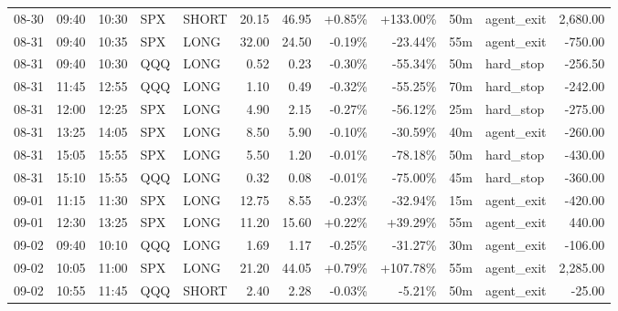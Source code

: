 \documentclass[11pt,a4paper,twoside]{article}
\begin{document}
\begin{center}
\begin{longtable}{>{\color{txtmain}}l l l l l r r r r r >{\color{txtmain}}l r}
08-30 & 09:40 & 10:30 & SPX & SHORT & 20.15 & 46.95 & \textcolor{wingreen}{+0.85\%} & \textcolor{wingreen}{+133.00\%} & 50m & agent\_exit & \textcolor{wingreen}{2,680.00} \\
08-31 & 09:40 & 10:35 & SPX & LONG & 32.00 & 24.50 & \textcolor{lossred}{-0.19\%} & \textcolor{lossred}{-23.44\%} & 55m & agent\_exit & \textcolor{lossred}{-750.00} \\
08-31 & 09:40 & 10:30 & QQQ & LONG & 0.52 & 0.23 & \textcolor{lossred}{-0.30\%} & \textcolor{lossred}{-55.34\%} & 50m & hard\_stop & \textcolor{lossred}{-256.50} \\
08-31 & 11:45 & 12:55 & QQQ & LONG & 1.10 & 0.49 & \textcolor{lossred}{-0.32\%} & \textcolor{lossred}{-55.25\%} & 70m & hard\_stop & \textcolor{lossred}{-242.00} \\
08-31 & 12:00 & 12:25 & SPX & LONG & 4.90 & 2.15 & \textcolor{lossred}{-0.27\%} & \textcolor{lossred}{-56.12\%} & 25m & hard\_stop & \textcolor{lossred}{-275.00} \\
08-31 & 13:25 & 14:05 & SPX & LONG & 8.50 & 5.90 & \textcolor{lossred}{-0.10\%} & \textcolor{lossred}{-30.59\%} & 40m & agent\_exit & \textcolor{lossred}{-260.00} \\
08-31 & 15:05 & 15:55 & SPX & LONG & 5.50 & 1.20 & \textcolor{lossred}{-0.01\%} & \textcolor{lossred}{-78.18\%} & 50m & hard\_stop & \textcolor{lossred}{-430.00} \\
08-31 & 15:10 & 15:55 & QQQ & LONG & 0.32 & 0.08 & \textcolor{lossred}{-0.01\%} & \textcolor{lossred}{-75.00\%} & 45m & hard\_stop & \textcolor{lossred}{-360.00} \\
09-01 & 11:15 & 11:30 & SPX & LONG & 12.75 & 8.55 & \textcolor{lossred}{-0.23\%} & \textcolor{lossred}{-32.94\%} & 15m & agent\_exit & \textcolor{lossred}{-420.00} \\
09-01 & 12:30 & 13:25 & SPX & LONG & 11.20 & 15.60 & \textcolor{wingreen}{+0.22\%} & \textcolor{wingreen}{+39.29\%} & 55m & agent\_exit & \textcolor{wingreen}{440.00} \\
09-02 & 09:40 & 10:10 & QQQ & LONG & 1.69 & 1.17 & \textcolor{lossred}{-0.25\%} & \textcolor{lossred}{-31.27\%} & 30m & agent\_exit & \textcolor{lossred}{-106.00} \\
09-02 & 10:05 & 11:00 & SPX & LONG & 21.20 & 44.05 & \textcolor{wingreen}{+0.79\%} & \textcolor{wingreen}{+107.78\%} & 55m & agent\_exit & \textcolor{wingreen}{2,285.00} \\
09-02 & 10:55 & 11:45 & QQQ & SHORT & 2.40 & 2.28 & \textcolor{lossred}{-0.03\%} & \textcolor{lossred}{-5.21\%} & 50m & agent\_exit & \textcolor{lossred}{-25.00} \\

\end{longtable}
\end{center}
\end{document}
